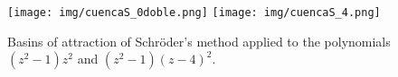 \IfFileExists{aims.cls}{\documentclass{aims}}{\documentclass[11pt]{article}}
\numberwithin{equation}{section}
\newcommand{\includegraphics}[2][]{%
  }%
\renewcommand{\includegraphics}[2][]{%
  }%
\theoremstyle{thmstyleone}%
\theoremstyle{thmstyletwo}%
\theoremstyle{thmstylethree}%
\begin{document}
\begin{figure}[h]%
\centering
\texttt{[image: img/cuencaS\_0doble.png]}\quad
\texttt{[image: img/cuencaS\_4.png]}
\caption{Basins of attraction of Schr\"oder's method applied to the polynomials $(z^2-1)z^2$ and $(z^2-1)(z-4)^2$.}
\label{fig7}
\end{figure}
%
%
% 
%
%
%
\end{document}
